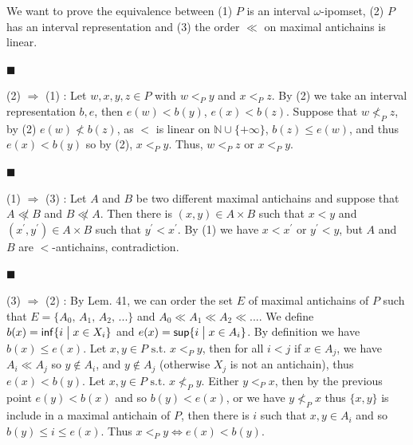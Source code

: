 \documentclass[10pt,a4paper]{article}
\begin{document}
 
We want to prove the equivalence between (1) $P$ is an interval $\omega$-ipomset, (2) $P$ has an interval representation and (3) the order $\ll$ on maximal antichains is linear.\par
  
\par\noindent  $\blacksquare$ 
 
(2) $\Rightarrow$ (1) : Let $w,x,y,z\in P$ with $w<_{P}y$ and $x<_{P}z$. By (2) we take an interval representation $b,e$, then $e(w)<b(y)$, $e(x)<b(z)$. Suppose that $w\nless_{P}z$, by (2) $e(w)\nless b(z)$, as $<$ is linear on $\mathbb{N}\cup{\{+\infty\}}$, $b(z)\leqslant e(w)$, and thus $e(x)<b(y)$ so by (2), $x<_{P}y$. Thus, $w<_{P}z$ or $x<_{P}y$.\par
 
 
 
\par\noindent  $\blacksquare$ 
 
(1) $\Rightarrow$ (3) : Let $A$ and $B$ be two different maximal antichains and suppose that $A\not\ll B$ and $B\not\ll A$. Then there is $(x,y)\in A\times B$ such that $x<y$ and $(x^{\prime},y^{\prime})\in A\times B$ such that $y^{\prime}<x^{\prime}$. By (1) we have $x<x^{\prime}$ or $y^{\prime}<y$, but $A$ and $B$ are $<$-antichains, contradiction.\par
 
 
 
\par\noindent  $\blacksquare$ 
 
(3) $\Rightarrow$ (2) : By Lem. 41, we can order the set $E$ of maximal antichains of $P$ such that $E={\{A_{0},\,A_{1},\,A_{2},\,...\}}$ and $A_{0}\ll A_{1}\ll A_{2}\ll...$. We define $b(x)=\mathsf{inf}{\{i\mathrel{\big{|}}x\in X_{i}\}}$ and $e(x)=\mathsf{sup}{\{i\mathrel{\big{|}}x\in A_{i}\}}$. By definition we have $b(x)\leqslant e(x)$. Let $x,y\in P\text{ s.t.\ }x<_{P}y$, then for all $i<j$ if $x\in A_{j}$, we have $A_{i}\ll A_{j}$ so $y\not\in A_{i}$, and $y\not\in A_{j}$ (otherwise $X_{j}$ is not an antichain), thus $e(x)<b(y)$. Let $x,y\in P\text{ s.t.\ }x\not<_{P}y$. Either $y<_{P}x$, then by the previous point $e(y)<b(x)$ and so $b(y)<e(x)$, or we have $y\not<_{P}x$ thus ${\{x,y\}}$ is include in a maximal antichain of $P$, then there is $i$ such that $x,y\in A_{i}$ and so $b(y)\leqslant i\leqslant e(x)$. Thus $x<_{P}y\Leftrightarrow e(x)<b(y)$.\par
 
\end{document}
